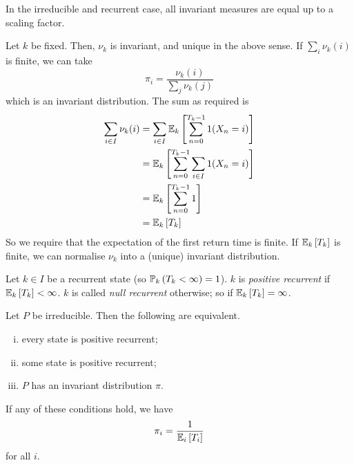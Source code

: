 \begin{remark}
	In the irreducible and recurrent case, all invariant measures are equal up to a scaling factor.
\end{remark}
\noindent Let \( k \) be fixed.
Then, \( \nu_k \) is invariant, and unique in the above sense.
If \( \sum_i \nu_k(i) \) is finite, we can take
\[
	\pi_i = \frac{\nu_k(i)}{\sum_j \nu_k(j)}
\]
which is an invariant distribution.
The sum as required is
\begin{align*}
	\sum_{i \in I} \nu_k(i) & = \sum_{i\in I} \mathbb{E}_{k}\left[{\sum_{n=0}^{T_k - 1} 1(X_n = i)}\right]  \\
	                        & = \mathbb{E}_{k}\left[{\sum_{n=0}^{T_k - 1} \sum_{i \in I} 1(X_n = i)}\right] \\
	                        & = \mathbb{E}_{k}\left[{\sum_{n=0}^{T_k - 1} 1}\right]                         \\
	                        & = \mathbb{E}_{k}\left[{T_k}\right]                                            \\
\end{align*}
So we require that the expectation of the first return time is finite.
If \( \mathbb{E}_{k}\left[{T_k}\right] \) is finite, we can normalise \( \nu_k \) into a (unique) invariant distribution.
\begin{definition}
	Let \( k \in I \) be a recurrent state (so \( \mathbb{P}_{k}\left({T_k < \infty}\right) = 1 \)).
	\( k \) is \textit{positive recurrent} if \( \mathbb{E}_{k}\left[{T_k}\right] < \infty \).
	\( k \) is called \textit{null recurrent} otherwise; so if \( \mathbb{E}_{k}\left[{T_k}\right] = \infty \).
\end{definition}
\begin{theorem}
	Let \( P \) be irreducible.
	Then the following are equivalent.
	\begin{enumerate}[(i)]
		\item every state is positive recurrent;
		\item some state is positive recurrent;
		\item \( P \) has an invariant distribution \( \pi \).
	\end{enumerate}
	If any of these conditions hold, we have
	\[
		\pi_i = \frac{1}{\mathbb{E}_{i}\left[{T_i}\right]}
	\]
	for all \( i \).
\end{theorem}
